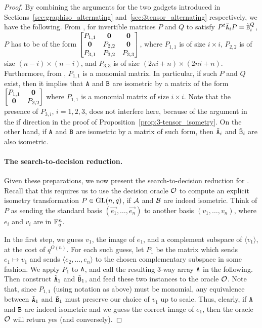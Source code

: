 \documentclass[11pt]{article}
\begin{document}
\begin{proof}
By combining the arguments for the two gadgets introduced in 
Sections~\ref{sec:graphiso_alternating} 
and~\ref{sec:3tensor_alternating} respectively, we have the following. From , for 
invertible matrices $P$ and $Q$ to satisfy $P^t\tilde{\mathtt{A}}_i 
P=\tilde{\mathtt{B}}_i^Q$, $P$ has to be of the form
$
\begin{bmatrix}
P_{1,1} & \mathbf{0} & \mathbf{0} \\
\mathbf{0} & P_{2,2} & \mathbf{0} \\
P_{3,1} & P_{3,2} & P_{3,3}
\end{bmatrix}$,
where $P_{1,1}$ is of size $i\times i$, $P_{2,2}$ is of size $(n-i)\times (n-i)$, 
and $P_{3,3}$ is of size $(2ni+n)\times (2ni+n)$. Furthermore, from , $P_{1,1}$ is a 
monomial matrix. In particular, if such $P$ and $Q$ exist, then it implies that 
$\mathtt{A}$ and $\mathtt{B}$ are isometric by a matrix of the form $\begin{bmatrix} P_{1,1} & 
\mathbf{0} \\ \mathbf{0} & P_{2,2}\end{bmatrix}$ where $P_{1,1}$ is a monomial matrix of 
size $i\times i$. 
Note that the presence of $P_{3,i}$, $i=1,2,3$, does not interfere here, because 
of the argument in the if direction in the proof of 
Proposition~\ref{prop:3-tensor_isometry}.
On the other hand, if $\mathtt{A}$ and $\mathtt{B}$ are isometric by a matrix 
of such form, then $\tilde{\mathtt{A}}_i$ and $\tilde{\mathtt{B}}_i$ are also isometric.

\paragraph{The search-to-decision reduction.} Given these preparations, we now 
present the search-to-decision reduction for 
\AltMatSpIsomlong. Recall that this requires us to use 
the decision oracle $\mathcal{O}$ to compute an explicit isometry transformation $P\in 
\mathrm{GL}(n, q)$, if $\mathcal{A}$ and $\mathcal{B}$ are indeed isometric. Think of $P$ as sending the 
standard basis $(\vec{e_1}, \dots, \vec{e_n})$ to another basis $(v_1, \dots, 
v_n)$, where $e_i$ and $v_i$ are in $\mathbb{F}_q^n$.

In the first step, we guess $v_1$, the image of $e_1$, and a complement subspace 
of $\langle v_1\rangle$, at the cost of $q^{O(n)}$. For each such guess, 
let $P_1$ be the matrix which sends $e_1 \mapsto v_1$ and sends $\langle e_2, 
\dotsc, e_n \rangle$ to the chosen complementary subspace in some fashion. We 
apply $P_1$ to 
$\mathtt{A}$, and call the resulting $3$-way array 
$\mathtt{A}$ in the following. Then construct $\tilde{\mathtt{A}}_1$ and $\tilde{\mathtt{B}}_1$, and feed 
these two 
instances to the oracle $\mathcal{O}$. 
Note that, since $P_{1,1}$ (using notation as above) must be monomial, any 
equivalence between $\tilde {\mathtt{A}}_1$ and $\tilde {\mathtt{B}}_1$ must preserve our choice of 
$v_1$ up to scale. Thus, clearly, if $\mathtt{A}$ and $\mathtt{B}$ are indeed 
isometric and we guess the correct image of $e_1$, then the oracle $\mathcal{O}$ will 
return yes (and conversely).


\end{proof}
\end{document}
